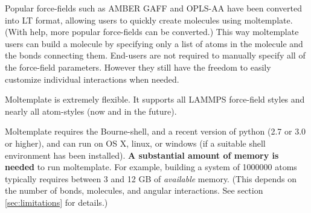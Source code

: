 \documentclass[11pt]{article}
\begin{document}
Popular force-fields such as AMBER GAFF and OPLS-AA have been converted into LT format, allowing users to quickly create molecules using moltemplate.  (With help, more popular force-fields can be converted.)  This way moltemplate users can build a molecule by specifying only a list of atoms in the molecule and the bonds connecting them.  End-users are not required to manually specify all of the force-field parameters.  However they still have the freedom to easily customize individual interactions when needed.

Moltemplate is extremely flexible.  It supports all LAMMPS force-field styles and nearly all atom-styles (now and in the future).



Moltemplate requires the Bourne-shell, and a recent version of python (2.7 or 3.0 or higher), and can run on OS X, linux, or windows (if a suitable shell environment has been installed).  
\textbf{A substantial amount of memory is needed} to run moltemplate.
For example, building a system of 1000000 atoms typically requires 
between 3 and 12 GB of \textit{available} memory.
(This depends on the number of bonds, molecules, and angular interactions.
 See section \ref{sec:limitations} for details.)
\end{document}

